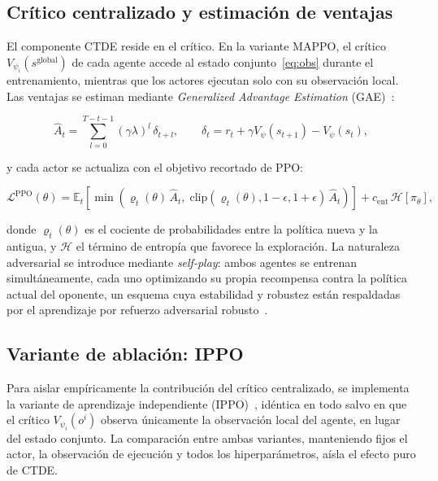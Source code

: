 \subsection{Crítico centralizado y estimación de ventajas}

El componente CTDE reside en el crítico. En la variante MAPPO, el crítico $V_{\psi_i}(s^{\text{global}})$ de cada agente accede al estado conjunto~\eqref{eq:obs} durante el entrenamiento, mientras que los actores ejecutan solo con su observación local. Las ventajas se estiman mediante \emph{Generalized Advantage Estimation} (GAE)~\cite{Schulman2016}:

\begin{equation}
  \hat{A}_t = \sum_{l=0}^{T-t-1} (\gamma\lambda)^l\, \delta_{t+l}, \qquad \delta_t = r_t + \gamma V_\psi(s_{t+1}) - V_\psi(s_t), \label{eq:gae}
\end{equation}

y cada actor se actualiza con el objetivo recortado de PPO:

\begin{equation}
  \mathcal{L}^{\text{PPO}}(\theta) = \mathbb{E}_t\!\left[\min\left(\varrho_t(\theta)\,\hat{A}_t,\; \mathrm{clip}(\varrho_t(\theta), 1-\epsilon, 1+\epsilon)\,\hat{A}_t\right)\right] + c_{\text{ent}}\, \mathcal{H}[\pi_\theta], \label{eq:ppo}
\end{equation}

donde $\varrho_t(\theta)$ es el cociente de probabilidades entre la política nueva y la antigua, y $\mathcal{H}$ el término de entropía que favorece la exploración. La naturaleza adversarial se introduce mediante \emph{self-play}: ambos agentes se entrenan simultáneamente, cada uno optimizando su propia recompensa contra la política actual del oponente, un esquema cuya estabilidad y robustez están respaldadas por el aprendizaje por refuerzo adversarial robusto~\cite{Pinto2017}.

\subsection{Variante de ablación: IPPO}

Para aislar empíricamente la contribución del crítico centralizado, se implementa la variante de aprendizaje independiente (IPPO)~\cite{deWitt2020}, idéntica en todo salvo en que el crítico $V_{\psi_i}(o^i)$ observa únicamente la observación local del agente, en lugar del estado conjunto. La comparación entre ambas variantes, manteniendo fijos el actor, la observación de ejecución y todos los hiperparámetros, aísla el efecto puro de CTDE.


